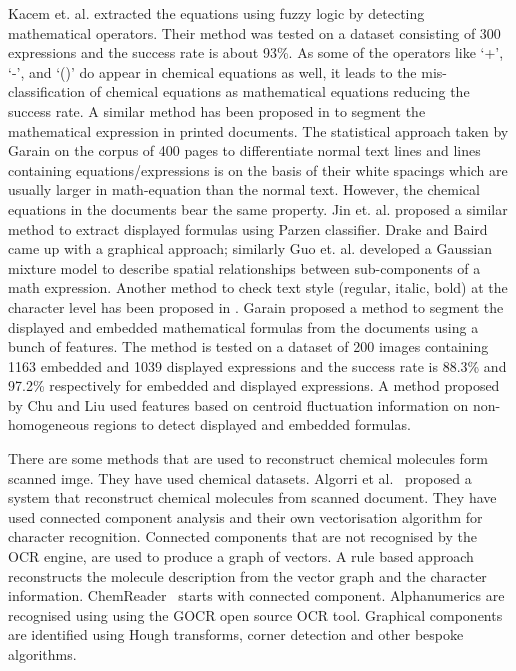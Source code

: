 \documentclass[oneside,a4paper,12pt]{book}
\begin{document}
   Kacem et. al. \cite{kacem_01} extracted the equations using fuzzy logic by detecting mathematical  
  operators. Their method was tested on a dataset consisting of 300 expressions and the success rate is about 93\%.
  As some of the operators like `+', `-', and `()' do appear in chemical equations as well, it leads to the 
  mis-classification of chemical equations  as mathematical equations reducing the success rate.
A similar method has been proposed in \cite{suzuki_03} to segment 
  the mathematical expression in printed documents.
  The statistical approach taken by Garain \cite{Garain_05} on the corpus of 400 pages to differentiate normal 
  text lines and lines containing equations/expressions is on the basis of their white spacings which are usually larger in math-equation than the normal text. However, the    
  chemical equations in the  documents bear the same property. Jin et. al.\cite{jin_03} proposed a similar method to extract displayed formulas using  Parzen classifier.
  Drake and Baird \cite{drake_05} came up with a graphical approach; similarly Guo et. al.\cite{guo_07} developed a Gaussian mixture model
  to describe spatial relationships between sub-components of a math expression. 
   Another method to check text style (regular, italic, bold) at the character level has been proposed in \cite{Garain_01}.
   Garain \cite{Garain_09} proposed a method to segment the displayed and embedded mathematical formulas from the documents using a 
   bunch of features. The method is tested on a dataset of 200 images containing 1163 embedded and 1039 displayed expressions
   and the success rate is 88.3\% and 97.2\% respectively for embedded and displayed expressions.
   A method proposed by Chu and Liu \cite{liu_13} used features based on centroid fluctuation 
  information on non-homogeneous regions to detect displayed and embedded formulas. 

There are some methods that are used to reconstruct chemical molecules form scanned imge. They have used chemical datasets. Algorri et al.~\cite{algorri_07, algorri_07a} proposed a system that reconstruct chemical molecules from scanned document. They have used connected component analysis and their own vectorisation algorithm for character recognition. Connected components that are not recognised by the OCR engine, are used to produce a graph of vectors. A rule based approach reconstructs the molecule description from the vector graph and the character information. 
ChemReader~\cite{park_09} starts with connected component. Alphanumerics are  recognised using using the GOCR open source OCR tool. Graphical components are  identified using Hough transforms, corner detection and other bespoke algorithms.
\end{document}
